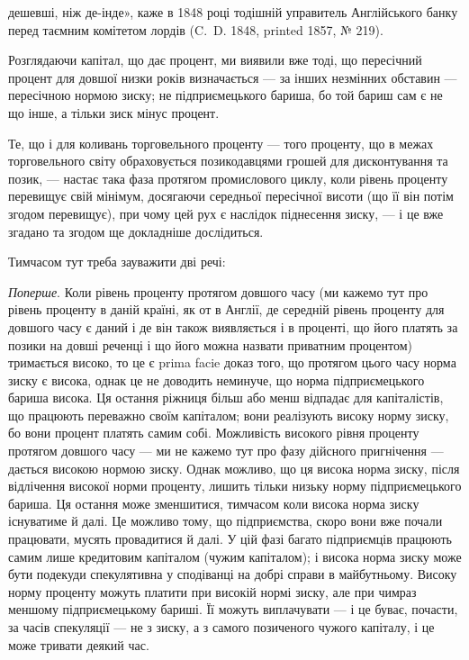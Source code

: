 \parcont{}  %
дешевші, ніж де-інде», каже в 1848 році тодішній управитель Англійського
банку перед таємним комітетом лордів (C.~D. 1848, printed 1857, № 219).

Розглядаючи капітал, що дає процент, ми виявили вже тоді, що пересічний
процент для довшої низки років визначається — за інших незмінних обставин
— пересічною нормою зиску; не підприємецького бариша, бо той бариш
сам є не що інше, а тільки зиск мінус процент.

Те, що і для коливань торговельного проценту — того проценту, що в межах
торговельного світу обраховується позикодавцями грошей для дисконтування
та позик, — настає така фаза протягом промислового циклу, коли рівень проценту
перевищує свій мінімум, досягаючи середньої пересічної висоти (що її він
потім згодом перевищує), при чому цей рух є наслідок піднесення зиску, — і це
вже згадано та згодом ще докладніше дослідиться.

Тимчасом тут треба зауважити дві речі:

\emph{Поперше}. Коли рівень проценту протягом довшого часу (ми кажемо тут
про рівень проценту в даній країні, як от в Англії, де середній рівень проценту
для довшого часу є даний і де він також виявляється і в проценті, що його платять
за позики на довші реченці і що його можна назвати приватним процентом)
тримається високо, то це є prima facie доказ того, що протягом цього
часу норма зиску є висока, однак це не доводить неминуче, що норма підприємецького
бариша висока. Ця остання ріжниця більш або менш відпадає для
капіталістів, що працюють переважно своїм капіталом; вони реалізують високу
норму зиску, бо вони процент платять самим собі. Можливість високого рівня
проценту протягом довшого часу — ми не кажемо тут про фазу дійсного пригнічення
— дається високою нормою зиску. Однак можливо, що ця висока норма
зиску, після відлічення високої норми проценту, лишить тільки низьку норму
підприємецького бариша. Ця остання може зменшитися, тимчасом коли висока
норма зиску існуватиме й далі. Це можливо тому, що підприємства, скоро вони
вже почали працювати, мусять провадитися й далі. У цій фазі багато підприємців
працюють самим лише кредитовим капіталом (чужим капіталом); і висока
норма зиску може бути подекуди спекулятивна у сподіванці на добрі справи
в майбутньому. Високу норму проценту можуть платити при високій нормі зиску,
але при чимраз меншому підприємецькому бариші. Її можуть виплачувати —
і це буває, почасти, за часів спекуляції — не з зиску, а з самого позиченого
чужого капіталу, і це може тривати деякий час.

